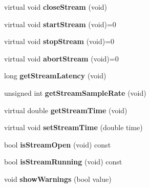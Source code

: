 \begin{DoxyCompactItemize}
\item 
virtual void {\bfseries close\+Stream} (void)\hypertarget{class_rt_api_a13e0f615a63a540446bd8bb7e44c293f}{}\label{class_rt_api_a13e0f615a63a540446bd8bb7e44c293f}

\item 
virtual void {\bfseries start\+Stream} (void)=0\hypertarget{class_rt_api_a10ee2f45dc6c1200da231365b4686ac8}{}\label{class_rt_api_a10ee2f45dc6c1200da231365b4686ac8}

\item 
virtual void {\bfseries stop\+Stream} (void)=0\hypertarget{class_rt_api_af17a556cb2534b53da961d3a6acba11e}{}\label{class_rt_api_af17a556cb2534b53da961d3a6acba11e}

\item 
virtual void {\bfseries abort\+Stream} (void)=0\hypertarget{class_rt_api_af65fd257cc358db6da29fbcef90287c7}{}\label{class_rt_api_af65fd257cc358db6da29fbcef90287c7}

\item 
long {\bfseries get\+Stream\+Latency} (void)\hypertarget{class_rt_api_afa13bea09f646779d8b9cbc829d7675f}{}\label{class_rt_api_afa13bea09f646779d8b9cbc829d7675f}

\item 
unsigned int {\bfseries get\+Stream\+Sample\+Rate} (void)\hypertarget{class_rt_api_a349576b3f0982428bef389a82946009d}{}\label{class_rt_api_a349576b3f0982428bef389a82946009d}

\item 
virtual double {\bfseries get\+Stream\+Time} (void)\hypertarget{class_rt_api_a5b3e624c2833c692674069cd0d13d2dc}{}\label{class_rt_api_a5b3e624c2833c692674069cd0d13d2dc}

\item 
virtual void {\bfseries set\+Stream\+Time} (double time)\hypertarget{class_rt_api_a30c5120d03bdc68c4c096a1e279ea0fe}{}\label{class_rt_api_a30c5120d03bdc68c4c096a1e279ea0fe}

\item 
bool {\bfseries is\+Stream\+Open} (void) const \hypertarget{class_rt_api_a239137ab1d22db7e35655d44162391d3}{}\label{class_rt_api_a239137ab1d22db7e35655d44162391d3}

\item 
bool {\bfseries is\+Stream\+Running} (void) const \hypertarget{class_rt_api_a6ce7d955a1e7319137214db028cfbb07}{}\label{class_rt_api_a6ce7d955a1e7319137214db028cfbb07}

\item 
void {\bfseries show\+Warnings} (bool value)\hypertarget{class_rt_api_a3c28d90eda75287192b012eba92718ec}{}\label{class_rt_api_a3c28d90eda75287192b012eba92718ec}

\end{DoxyCompactItemize}
